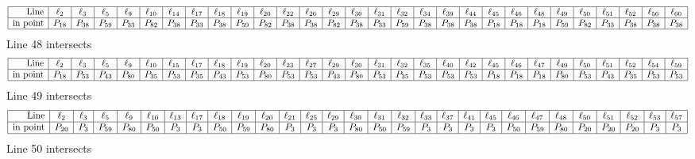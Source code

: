 \documentclass{article}
\begin{document}
{$$
\begin{array}{|r*{28}{|c}|}
\hline
\mbox{Line}  & \ell_{2} & \ell_{3} & \ell_{5} & \ell_{9} & \ell_{10} & \ell_{14} & \ell_{17} & \ell_{18} & \ell_{19} & \ell_{20} & \ell_{22} & \ell_{26} & \ell_{29} & \ell_{30} & \ell_{31} & \ell_{32} & \ell_{34} & \ell_{39} & \ell_{44} & \ell_{45} & \ell_{46} & \ell_{48} & \ell_{49} & \ell_{50} & \ell_{51} & \ell_{52} & \ell_{56} & \ell_{60}\\
\hline
\mbox{in point}  & P_{18} & P_{38} & P_{59} & P_{33} & P_{82} & P_{38} & P_{33} & P_{38} & P_{59} & P_{82} & P_{38} & P_{38} & P_{82} & P_{38} & P_{33} & P_{59} & P_{38} & P_{38} & P_{38} & P_{18} & P_{18} & P_{18} & P_{59} & P_{82} & P_{33} & P_{38} & P_{38} & P_{38}\\
\hline
\end{array}
$$
Line 48 intersects 
$$
\begin{array}{|r*{28}{|c}|}
\hline
\mbox{Line}  & \ell_{2} & \ell_{3} & \ell_{5} & \ell_{9} & \ell_{10} & \ell_{15} & \ell_{17} & \ell_{18} & \ell_{19} & \ell_{20} & \ell_{23} & \ell_{27} & \ell_{29} & \ell_{30} & \ell_{31} & \ell_{32} & \ell_{35} & \ell_{40} & \ell_{42} & \ell_{45} & \ell_{46} & \ell_{47} & \ell_{49} & \ell_{50} & \ell_{51} & \ell_{52} & \ell_{54} & \ell_{59}\\
\hline
\mbox{in point}  & P_{18} & P_{53} & P_{43} & P_{80} & P_{35} & P_{53} & P_{35} & P_{43} & P_{53} & P_{80} & P_{53} & P_{53} & P_{43} & P_{80} & P_{53} & P_{35} & P_{53} & P_{53} & P_{53} & P_{18} & P_{18} & P_{18} & P_{80} & P_{53} & P_{43} & P_{35} & P_{53} & P_{53}\\
\hline
\end{array}
$$
Line 49 intersects 
$$
\begin{array}{|r*{28}{|c}|}
\hline
\mbox{Line}  & \ell_{2} & \ell_{3} & \ell_{5} & \ell_{9} & \ell_{10} & \ell_{13} & \ell_{17} & \ell_{18} & \ell_{19} & \ell_{20} & \ell_{21} & \ell_{25} & \ell_{29} & \ell_{30} & \ell_{31} & \ell_{32} & \ell_{33} & \ell_{37} & \ell_{41} & \ell_{45} & \ell_{46} & \ell_{47} & \ell_{48} & \ell_{50} & \ell_{51} & \ell_{52} & \ell_{53} & \ell_{57}\\
\hline
\mbox{in point}  & P_{20} & P_{3} & P_{59} & P_{80} & P_{50} & P_{3} & P_{3} & P_{50} & P_{59} & P_{80} & P_{3} & P_{3} & P_{3} & P_{80} & P_{50} & P_{59} & P_{3} & P_{3} & P_{3} & P_{3} & P_{50} & P_{59} & P_{80} & P_{20} & P_{20} & P_{20} & P_{3} & P_{3}\\
\hline
\end{array}
$$
Line 50 intersects 
$$
\begin{array}{|r*{28}{|c}|}

\end{array}$$}
\end{document}
